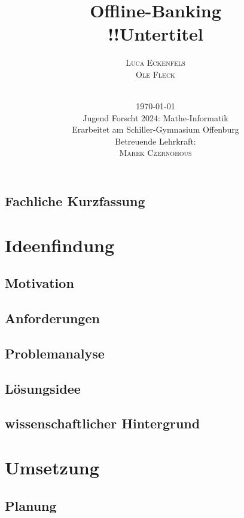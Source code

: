 \documentclass[a4paper,12pt,ngerman]{scrreport}
\title{Offline-Banking\\
    \vspace{6mm}
    \large{!!Untertitel}}
\author{\Large{\textsc{Luca Eckenfels}}\\\textsc{Ole Fleck}\\
    \vspace{5cm}\\
\date{\today\\\vspace{12mm}
Jugend Forscht 2024: Mathe-Informatik\\\vspace{6mm}
    Erarbeitet am Schiller-Gymnasium Offenburg\\
Betreuende Lehrkraft: \\\textsc{Marek Czernohous}}
}
\begin{document}
    \maketitle
    \tableofcontents
    \newpage
    \section*{Fachliche Kurzfassung}

    \chapter{Ideenfindung}\label{ch:einleitung}
    \section{Motivation}

    \section{Anforderungen}

    \section{Problemanalyse}

    \section{Lösungsidee}

    \section{wissenschaftlicher Hintergrund}


    \chapter{Umsetzung}\label{ch:umsetzung}
    \section{Planung}
\end{document}
